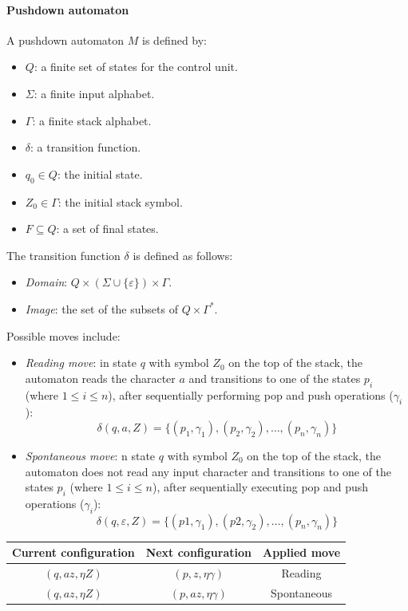 \paragraph*{Pushdown automaton}
A pushdown automaton $M$ is defined by:
\begin{itemize}
    \item $Q$: a finite set of states for the control unit.
    \item $\Sigma$: a finite input alphabet.
    \item $\Gamma$: a finite stack alphabet.
    \item $\delta$: a transition function.
    \item $q_0 \in Q$: the initial state.
    \item $Z_0 \in \Gamma$: the initial stack symbol.
    \item $F \subseteq Q$: a set of final states.
\end{itemize}
The transition function $\delta$ is defined as follows:
\begin{itemize}
    \item \textit{Domain}: $Q \times \left(\Sigma \cup \{\varepsilon\}\right) \times \Gamma$. 
    \item \textit{Image}: the set of the subsets of $Q \times \Gamma^{\ast}$. 
\end{itemize}
Possible moves include:
\begin{itemize}
    \item \textit{Reading move}: in state $q$ with symbol $Z_0$ on the top of the stack, the automaton reads the character $a$ and transitions to one of the states $p_i$ (where $1 \leq i \leq n$), after sequentially performing pop and push operations ($\gamma_i$): 
        \[\delta(q,a,Z)=\{(p_1,\gamma_1), (p_2,\gamma_2),\dots,(p_n,\gamma_n)\}\]
    \item \textit{Spontaneous move}: n state $q$ with symbol $Z_0$ on the top of the stack, the automaton does not read any input character and transitions to one of the states $p_i$ (where $1 \leq i \leq n$), after sequentially executing pop and push operations ($\gamma_i$):
        \[\delta(q,\varepsilon,Z)=\{(p1,\gamma_1), (p2,\gamma_2),\dots,(p_n,\gamma_n)\}\]
\end{itemize}
\begin{table}[H]
    \centering
    \begin{tabular}{ccc}
    \hline
    \textbf{Current configuration} & \textbf{Next configuration} & \textbf{Applied move} \\ \hline
    $(q,az,\eta Z)$                & $(p,z,\eta\gamma)$          & Reading               \\
    $(q,az,\eta Z)$                & $(p,az,\eta\gamma)$         & Spontaneous           \\ \hline
    \end{tabular}
\end{table}


